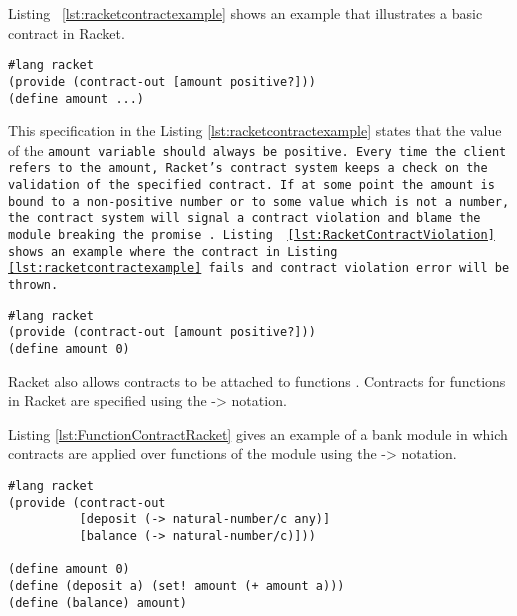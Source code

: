 \begin{minipage}{\linewidth}
Listing ~\ref{lst:racketcontractexample} shows an example that illustrates a basic contract in Racket.       
\begin{lstlisting}[frame=single, caption={Basic contract example in Racket},label = {lst:racketcontractexample}, captionpos=b, breaklines=true]
#lang racket
(provide (contract-out [amount positive?])) 
(define amount ...)
\end{lstlisting}
\end{minipage}

This specification in the Listing \ref{lst:racketcontractexample} states that the value of the \tt{amount} variable should always be positive. Every time the client refers to the amount, Racket's contract system keeps a check on the validation of the specified contract. If at some point the amount is bound to a non-positive number or to some value which is not a number, the contract system will signal a contract violation and blame the module breaking the promise \cite{RacketContracts}. Listing ~\ref{lst:RacketContractViolation} shows an example where the contract in Listing \ref{lst:racketcontractexample} fails and contract violation error will be thrown. \linebreak

\begin{minipage}{\linewidth}      
\begin{lstlisting}[frame=single, caption={Contract violation example in Racket}, label={lst:RacketContractViolation}, captionpos=b, breaklines=true]
#lang racket
(provide (contract-out [amount positive?])) 
(define amount 0)
\end{lstlisting}
\end{minipage}

Racket also allows contracts to be attached to functions \cite{RacketContractsFunc}. Contracts for functions in Racket are specified using the -> notation. 
\begin{minipage}{\linewidth}
Listing \ref{lst:FunctionContractRacket} gives an example of a bank module in which contracts are applied over functions of the module using the -> notation.       
\begin{lstlisting}[frame=single, caption={Contract over functions in Racket}, label={lst:FunctionContractRacket}, captionpos=b, breaklines=true]
#lang racket
(provide (contract-out
          [deposit (-> natural-number/c any)]
          [balance (-> natural-number/c)]))

(define amount 0)
(define (deposit a) (set! amount (+ amount a)))
(define (balance) amount)
\end{lstlisting}
\end{minipage}

